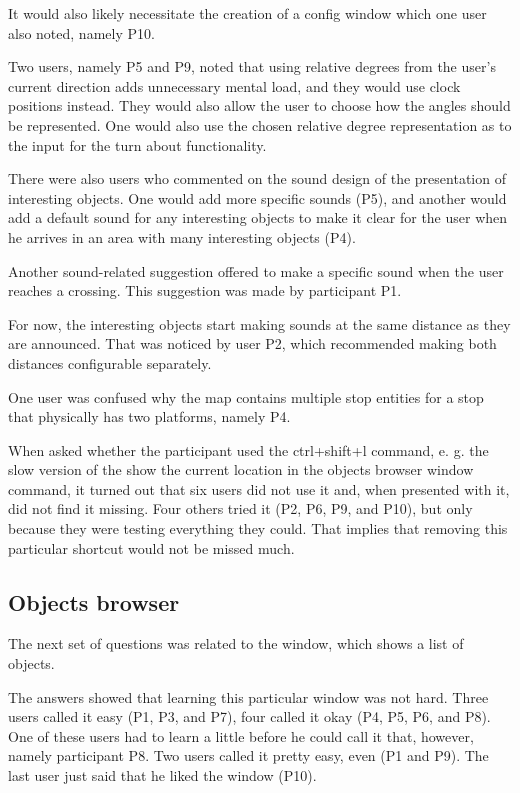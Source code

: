 \documentclass[nolof,digital]{fithesis3}
\begin{document}
It would also likely necessitate the creation of a config window which one user also noted, namely P10.

Two users, namely  P5 and P9, noted that using relative degrees from the user's current direction adds unnecessary mental load, and they would use clock positions instead. They would also allow the user to choose how the angles should be represented. One would also use the chosen relative degree representation as to the input for the turn about functionality.

There were also users who commented on the sound design of the presentation of interesting objects. One would add more specific sounds (P5), and another would add a default sound for any interesting objects to make it clear for the user when he arrives in an area with many interesting objects (P4).

Another sound-related suggestion offered to make a specific sound when the user reaches a crossing. This suggestion was made by participant P1.

For now, the interesting objects start making sounds at the same distance as they are announced. That was noticed by user P2, which recommended making both distances configurable separately.

One user was confused why the map contains multiple stop entities for a stop that physically has two platforms, namely P4.

When asked whether the participant used the ctrl+shift+l command, e. g. the slow version of the show the current location in the objects browser window command, it turned out that six users did not use it and, when presented with it, did not find it missing. Four others tried it (P2, P6, P9, and P10), but only because they were testing everything they could. That implies that removing this particular shortcut would not be missed much.
\subsection{Objects browser}
The next set of questions was related to the window, which shows a list of objects.

The answers showed that learning this particular window was not hard. Three users called it easy (P1, P3, and P7), four called it okay (P4, P5, P6, and P8). One of these users had to learn a little before he could call it that, however, namely participant P8. Two users called it pretty easy, even (P1 and P9). The last user just said that he liked the window (P10).
\end{document}
